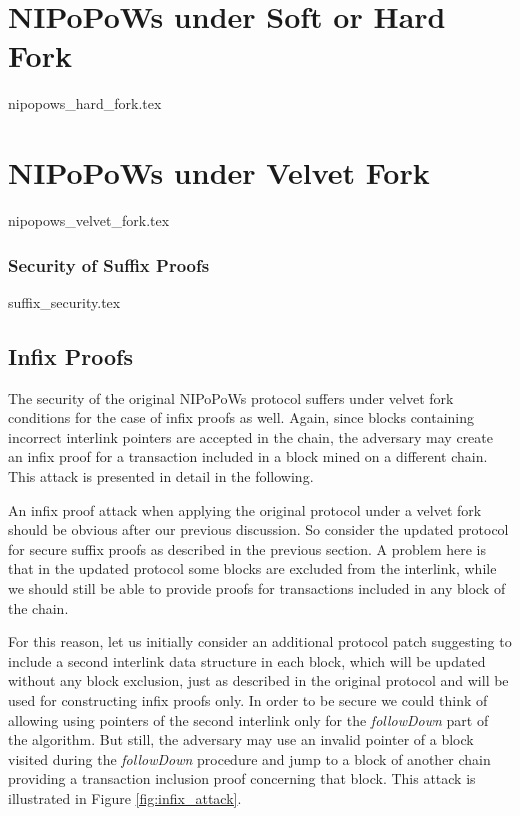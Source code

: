 \documentclass[10pt,a4paper]{article}
\begin{document}
\section{NIPoPoWs under Soft or Hard Fork}
{nipopows_hard_fork.tex}

\section{NIPoPoWs under Velvet Fork}
{nipopows_velvet_fork.tex}


\subsubsection{Security of Suffix Proofs}
{suffix_security.tex}


\subsection{Infix Proofs}
The security of the original NIPoPoWs protocol suffers under velvet fork conditions for the case of infix proofs as well. Again, since blocks containing incorrect interlink pointers are accepted in the chain, the adversary may create an infix proof for a transaction included in a block mined on a different chain. This attack is presented in detail in the following.

An infix proof attack when applying the original protocol under a velvet fork should be obvious after our previous discussion. So consider the updated protocol for secure suffix proofs as described in the previous section. A problem here is that in the updated protocol some blocks are excluded from the interlink, while we should still be able to provide proofs for transactions included in any block of the chain. 

For this reason, let us initially consider an additional protocol patch suggesting to include a second interlink data structure in each block, which will be updated without any block exclusion, just as described in the original protocol and will be used for constructing infix proofs only. In order to be secure we could think of allowing using pointers of the second interlink only for the \textit{followDown} part of the algorithm. But still, the adversary may use an invalid pointer of a block visited during the \textit{followDown} procedure and jump to a block of another chain providing a transaction inclusion proof concerning that block. This attack is illustrated in Figure \ref{fig:infix_attack}.
\end{document}

